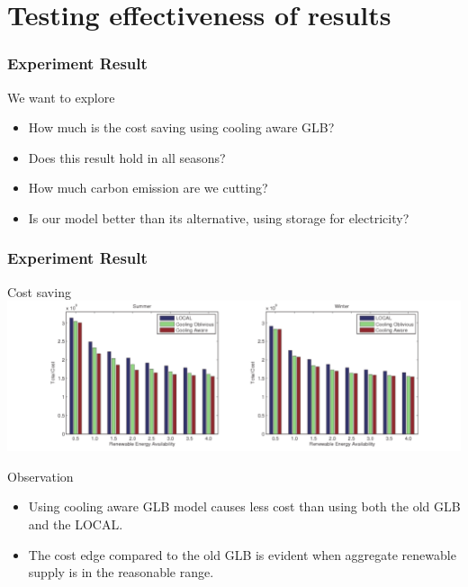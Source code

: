 \documentclass[xcolor=dvipsnames]{beamer}
\begin{document}
\section{Testing effectiveness of results}

\begin{frame}
\frametitle{Experiment Result}
\begin{block}
{We want to explore}
\begin{itemize}
\item
How much is the cost saving using cooling aware GLB? 
\item
Does this result hold in all seasons?
\item
How much carbon emission are we cutting?
\item
Is our model better than its alternative, using storage for electricity?
\end{itemize}
\end{block}
\end{frame}
%
%
\begin{frame}
\frametitle{Experiment Result}
\begin{block}
{Cost saving}
\includegraphics[scale = 0.37]{cost_comparison.pdf}
\end{block}
\begin{block}
{Observation}
\begin{itemize}
\item
Using cooling aware GLB model causes less cost than using both the old GLB and the LOCAL.
\item
The cost edge compared to the old GLB is evident when aggregate renewable supply is in the reasonable range. 
\end{itemize}
\end{block}
\end{frame}
%
%
\end{document}
